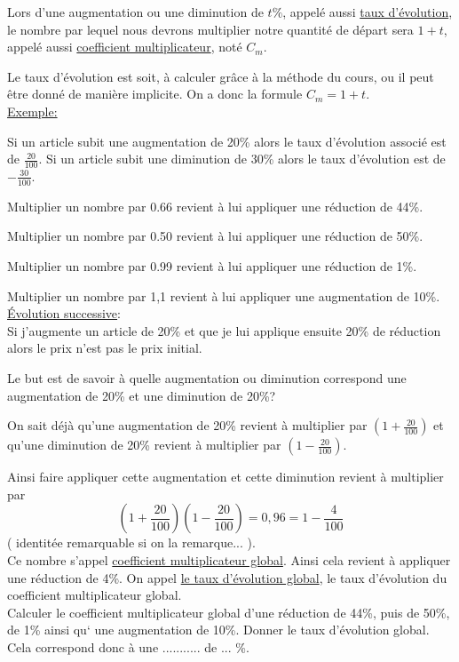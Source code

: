 \documentclass[french]{book}
\begin{document}
Lors d’une augmentation ou une diminution de $t\%$, appelé aussi \underline{taux d'évolution}, le nombre par lequel nous devrons multiplier notre quantité de départ sera $1+t$, appelé aussi \underline{coefficient multiplicateur}, noté $C_m$.

Le taux d’évolution est soit, à calculer grâce à la méthode du cours, ou il peut être donné de manière implicite. On a donc la formule $C_m=1+t$.\\


\underline{Exemple:} 

Si un article subit une augmentation de 20\% alors le taux d’évolution associé est de $\frac{20}{100}$.
Si un article subit une diminution de 30\% alors le taux d’évolution est de $-\frac{30}{100}$.

Multiplier un nombre par 0.66 revient à lui appliquer une réduction de 44\%. 

Multiplier un nombre par 0.50 revient à lui appliquer une réduction de 50\%. 

Multiplier un nombre par 0.99 revient à lui appliquer une réduction de 1\%. 

Multiplier un nombre par 1,1 revient à lui appliquer une augmentation de 10\%. \\



\underline{Évolution successive}:\\

Si j’augmente un article de 20\% et que je lui applique ensuite 
20\% de réduction alors le prix n’est pas le prix initial.

Le but est de savoir à quelle augmentation ou diminution correspond une augmentation de 20\% et une diminution 
de 20\%? 

On sait déjà qu’une augmentation de 20\% revient à multiplier par $(1+\frac{20}{100})$
et qu’une diminution de 20\% revient à multiplier par $(1-\frac{20}{100})$. 

Ainsi faire appliquer cette augmentation et cette diminution revient à multiplier par $$(1+\frac{20}{100})(1-\frac{20}{100}) = 0,96 = 1-\frac{4}{100}$$ ( identitée remarquable si on la remarque... ).\\


Ce nombre s’appel \underline{coefficient multiplicateur global}.
Ainsi cela revient à appliquer une réduction de 4\%.  On appel \underline{le taux d’évolution global}, le taux d’évolution du coefficient multiplicateur global.\\


Calculer le coefficient multiplicateur global d’une réduction de 44\%, puis de 
50\%, de 
1\% ainsi qu‘ une augmentation
de 10\%. 
Donner le taux d’évolution global. Cela correspond donc à une ........... de ... \%. 
\end{document}

